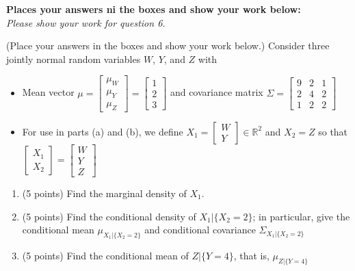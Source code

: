 \documentclass[letterpaper]{article}
\newcommand{\real}{\mathbb R}  %
\begin{document}
\noindent \textbf{Places your answers ni the boxes and show your work below:} \\



\newpage
\textit{Please show your work for question 6.}


\newpage

  (Place your answers in the boxes and show your work below.)  Consider three jointly normal random variables  $W$, $Y$, and $Z$ with
\begin{itemize}
	\item Mean vector $\mu= \begin{bmatrix} \mu_W \\\mu_Y\\ \mu_Z \end{bmatrix}= \begin{bmatrix} 1 \\2 \\ 3 \end{bmatrix}$ and covariance matrix $\Sigma =  \begin{bmatrix} 9 & 2 & 1\\2 & 4 & 2\\ 1 & 2 & 2 \end{bmatrix}$
 	\item For use in parts (a) and (b), we define $X_1 = \begin{bmatrix} W \\Y \end{bmatrix}\in \real^2$ and $X_2=Z$ so that $\begin{bmatrix} X_1 \\ X_2 \end{bmatrix} = \begin{bmatrix} W \\Y\\ Z \end{bmatrix}$
\end{itemize}
\begin{enumerate}
    \setlength{\itemsep}{.15in}
    \renewcommand{\labelenumi}{(\alph{enumi})}
    \setlength{\itemsep}{.1in}
    \item (5 points)  Find the marginal density of $X_1$.

    \item (5 points)  Find the conditional density of $X_1|\{X_2=2\}$; in particular, give the conditional mean $\mu_{X_1|\{X_2=2\}}$ and conditional covariance $\Sigma_{X_1|\{X_2=2\}}$

    \item (5 points)  Find the conditional mean of $Z|\{Y=4\}$, that is, $\mu_{Z|\{Y=4\}}$

\end{enumerate}
\end{document}
